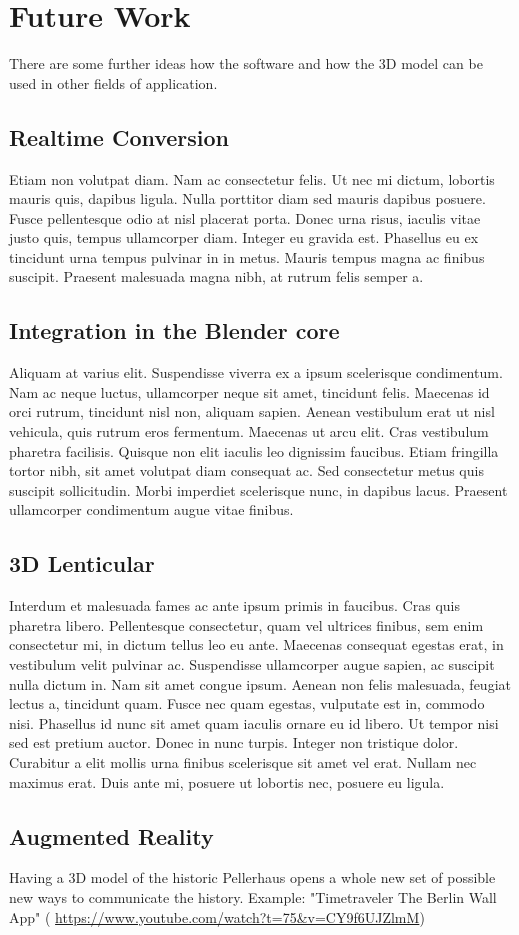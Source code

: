 \section{Future Work}

There are some further ideas how the software and how the 3D model can be used in other fields of application.

\subsection{Realtime Conversion}

Etiam non volutpat diam. Nam ac consectetur felis. Ut nec mi dictum, lobortis mauris quis, dapibus ligula. Nulla porttitor diam sed mauris dapibus posuere. Fusce pellentesque odio at nisl placerat porta. Donec urna risus, iaculis vitae justo quis, tempus ullamcorper diam. Integer eu gravida est. Phasellus eu ex tincidunt urna tempus pulvinar in in metus. Mauris tempus magna ac finibus suscipit. Praesent malesuada magna nibh, at rutrum felis semper a.

\subsection{Integration in the Blender core}

Aliquam at varius elit. Suspendisse viverra ex a ipsum scelerisque condimentum. Nam ac neque luctus, ullamcorper neque sit amet, tincidunt felis. Maecenas id orci rutrum, tincidunt nisl non, aliquam sapien. Aenean vestibulum erat ut nisl vehicula, quis rutrum eros fermentum. Maecenas ut arcu elit. Cras vestibulum pharetra facilisis. Quisque non elit iaculis leo dignissim faucibus. Etiam fringilla tortor nibh, sit amet volutpat diam consequat ac. Sed consectetur metus quis suscipit sollicitudin. Morbi imperdiet scelerisque nunc, in dapibus lacus. Praesent ullamcorper condimentum augue vitae finibus. 

\subsection{3D Lenticular}

Interdum et malesuada fames ac ante ipsum primis in faucibus. Cras quis pharetra libero. Pellentesque consectetur, quam vel ultrices finibus, sem enim consectetur mi, in dictum tellus leo eu ante. Maecenas consequat egestas erat, in vestibulum velit pulvinar ac. Suspendisse ullamcorper augue sapien, ac suscipit nulla dictum in. Nam sit amet congue ipsum. Aenean non felis malesuada, feugiat lectus a, tincidunt quam. Fusce nec quam egestas, vulputate est in, commodo nisi. Phasellus id nunc sit amet quam iaculis ornare eu id libero. Ut tempor nisi sed est pretium auctor. Donec in nunc turpis. Integer non tristique dolor. Curabitur a elit mollis urna finibus scelerisque sit amet vel erat. Nullam nec maximus erat. Duis ante mi, posuere ut lobortis nec, posuere eu ligula.

\subsection{Augmented Reality}

Having a 3D model of the historic Pellerhaus opens a whole new set of possible new ways to communicate the history. Example: "Timetraveler The Berlin Wall App" ( \url{https://www.youtube.com/watch?t=75&v=CY9f6UJZlmM})
